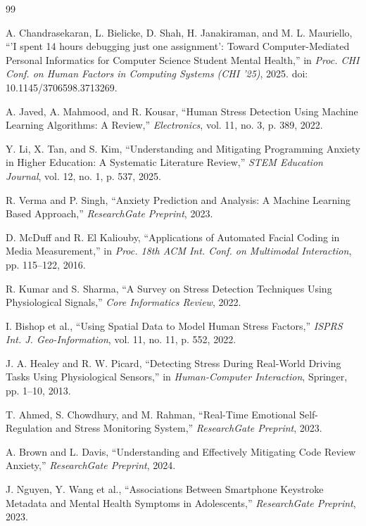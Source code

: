 \documentclass[a4paper,11pt]{report}
\begin{document}
\begin{thebibliography}{99}

 A. Chandrasekaran, L. Bielicke, D. Shah, H. Janakiraman, and M. L. Mauriello, ``'I spent 14 hours debugging just one assignment': Toward Computer-Mediated Personal Informatics for Computer Science Student Mental Health,'' in \emph{Proc. CHI Conf. on Human Factors in Computing Systems (CHI '25)}, 2025. doi: 10.1145/3706598.3713269. 

 A. Javed, A. Mahmood, and R. Kousar, ``Human Stress Detection Using Machine Learning Algorithms: A Review,'' \emph{Electronics}, vol. 11, no. 3, p. 389, 2022. 

 Y. Li, X. Tan, and S. Kim, ``Understanding and Mitigating Programming Anxiety in Higher Education: A Systematic Literature Review,'' \emph{STEM Education Journal}, vol. 12, no. 1, p. 537, 2025.

 R. Verma and P. Singh, ``Anxiety Prediction and Analysis: A Machine Learning Based Approach,'' \emph{ResearchGate Preprint}, 2023. 

 D. McDuff and R. El Kaliouby, ``Applications of Automated Facial Coding in Media Measurement,'' in \emph{Proc. 18th ACM Int. Conf. on Multimodal Interaction}, pp. 115--122, 2016. 

 R. Kumar and S. Sharma, ``A Survey on Stress Detection Techniques Using Physiological Signals,'' \emph{Core Informatics Review}, 2022.

 I. Bishop et al., ``Using Spatial Data to Model Human Stress Factors,'' \emph{ISPRS Int. J. Geo-Information}, vol. 11, no. 11, p. 552, 2022.

 J. A. Healey and R. W. Picard, ``Detecting Stress During Real-World Driving Tasks Using Physiological Sensors,'' in \emph{Human-Computer Interaction}, Springer, pp. 1--10, 2013.

 T. Ahmed, S. Chowdhury, and M. Rahman, ``Real-Time Emotional Self-Regulation and Stress Monitoring System,'' \emph{ResearchGate Preprint}, 2023.

 A. Brown and L. Davis, ``Understanding and Effectively Mitigating Code Review Anxiety,'' \emph{ResearchGate Preprint}, 2024.

 J. Nguyen, Y. Wang et al., ``Associations Between Smartphone Keystroke Metadata and Mental Health Symptoms in Adolescents,'' \emph{ResearchGate Preprint}, 2023. 


\end{thebibliography}
\end{document}
